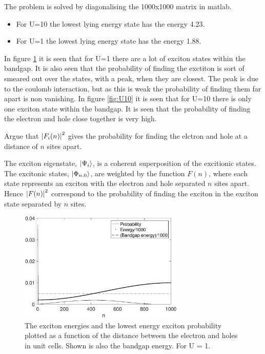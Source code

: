  
\begin{solution}
  The problem is solved by diagonalising the 1000x1000 matrix in matlab.
  \begin{itemize}
      \item For U=10 the lowest lying energy state has the energy 4.23.
      \item For U=1 the lowest lying energy state has the energy 1.88.
  \end{itemize}
In figure \ref{fig:U1} it is seen that for U=1 there are a lot of exciton states within the bandgap. It is also seen that the probability of finding the exctiton is sort of smeared out over the states, with a peak, when they are closest. The peak is due to the coulomb interaction, but as this is weak the probability of finding them far apart is non vanishing.\newline
In figure \ref{fig:U10} it is seen that for U=10 there is only one exciton state within the bandgap. It is seen that the probability of finding the electron and hole close together  is very high.
\end{solution}
\begin{exercise}
Argue that $\abs{F_i(n)}^2$ gives the probability for finding the elctron and hole at a distance of $n$ sites apart. 
\end{exercise}
\begin{solution}
  The exciton eigenstate, $|\Psi_i\rangle$, is a coherent superposition of the excitionic states. The excitonic states, $|\Phi_{n,0}\rangle$, are weighted by the function $F(n)$, where each state represents an exciton with the electron and hole separated $n$ sites apart. Hence $\abs{F(n)}^2$ correspond to the probability of finding the exciton in the exciton state separated by $n$ sites.
\end{solution}
\begin{figure}[!ht]
      \centering
      \includegraphics[width=0.7\textwidth]{fig/ExcitonStateU1.eps}
      \caption{The exciton energies and the lowest energy exciton probability plotted as a function of the distance between the electron and holes in unit cells. Shown is also the bandgap energy. For U = 1.} 
      \label{fig:U1}
  \end{figure}
